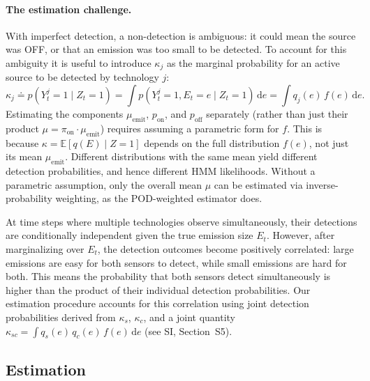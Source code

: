 \documentclass[unnumsec,webpdf,modern,mediumone]{oup-authoring-template}
\begin{document}
\paragraph{The estimation challenge.}
With imperfect detection, a non-detection is ambiguous: it could mean the source was OFF, or that an emission was too small to be detected. To account for this ambiguity it is useful to introduce $\kappa_j$ as the marginal probability for an active source to be detected by technology $j$:
\begin{equation}
    \kappa_j
    \doteq p(Y_{t}^j=1\mid Z_t=1)
    = \int p(Y_{t}^j=1,E_t=e\mid Z_t=1)\,\mathrm{d}e
    = \int q_j(e)\,f(e)\,\mathrm{d}e.
    \label{eq:kappa}
\end{equation}
Estimating the components $\mu_{\text{emit}}$, $p_{\text{on}}$, and $p_{\text{off}}$ separately (rather than just their product $\mu = \pi_{\text{on}} \cdot \mu_{\text{emit}}$) requires assuming a parametric form for $f$. This is because $\kappa = \mathbb{E}[q(E) \mid Z=1]$ depends on the full distribution $f(e)$, not just its mean $\mu_{\text{emit}}$. Different distributions with the same mean yield different detection probabilities, and hence different HMM likelihoods. Without a parametric assumption, only the overall mean $\mu$ can be estimated via inverse-probability weighting, as the POD-weighted estimator does.

At time steps where multiple technologies observe simultaneously, their detections are conditionally independent given the true emission size $E_t$. However, after marginalizing over $E_t$, the detection outcomes become positively correlated: large emissions are easy for both sensors to detect, while small emissions are hard for both. This means the probability that both sensors detect simultaneously is higher than the product of their individual detection probabilities. Our estimation procedure accounts for this correlation using joint detection probabilities derived from $\kappa_s$, $\kappa_c$, and a joint quantity $\kappa_{sc} = \int q_s(e)\, q_c(e)\, f(e)\, \mathrm{d}e$ (see SI, Section~S5).


\subsection{Estimation}
\label{sec:estimation}
\end{document}
